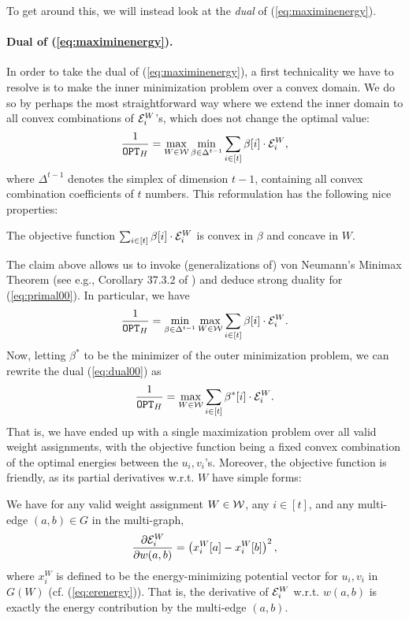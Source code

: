 \documentclass{article}
\begin{document}
To get around this, we will instead look at the \textit{dual} of
(\ref{eq:maximinenergy}).

\paragraph{Dual of (\ref{eq:maximinenergy}).}
In order to take the dual of (\ref{eq:maximinenergy}),
a first technicality we have to resolve is
to make
the inner minimization problem over a convex domain.
We do so by perhaps the most straightforward way where we extend the inner
domain to all convex combinations of $\mathcal{E}_i^{W}$'s,
which does not change the optimal value:
\begin{align}\label{eq:primal00}
    \frac{1}{\mathtt{OPT}_H} =
    \max_{W\in \mathcal{W}}\min_{\beta \in \Delta^{t-1}}
    \sum_{i\in [t]} \beta[i]\cdot \mathcal{E}_i^{W},
\end{align}
where $\Delta^{t-1}$ denotes the simplex of dimension $t-1$, containing
all convex combination coefficients of $t$ numbers.
This reformulation has the following nice properties:
\begin{claim}
    The objective function $\sum_{i\in [t]} \beta[i]\cdot \mathcal{E}_i^{W}$
    is convex in $\beta$ and concave in $W$.
\end{claim}

The claim above allows us to invoke (generalizations of) von Neumann's Minimax Theorem
(see e.g., Corollary 37.3.2 of \cite{Rockafellar70})
and deduce strong duality for (\ref{eq:primal00}). In particular, we have
\begin{align}\label{eq:dual00}
    \frac{1}{\mathtt{OPT}_H} = \min_{\beta \in \Delta^{t-1}}
    \max_{W\in \mathcal{W}}
    \sum_{i\in [t]} \beta[i]\cdot \mathcal{E}_i^{W}.
\end{align}
Now, letting $\beta^*$ to be the minimizer of the outer minimization problem,
we can rewrite the dual (\ref{eq:dual00}) as
\begin{align}\label{eq:dual11}
    \frac{1}{\mathtt{OPT}_H} =
    \max_{W\in \mathcal{W}}
    \sum_{i\in [t]} \beta^*[i]\cdot \mathcal{E}_i^{W}.
\end{align}
That is, we have ended up with a single maximization problem
over all valid weight assignments,
with the objective function being a fixed convex combination
of the optimal energies between the $u_i,v_i$'s.
Moreover, the objective function is friendly, as its partial derivatives w.r.t. $W$
have simple forms:
\begin{claim}
     We have for any valid weight assignment $W\in \mathcal{W}$,
    any $i\in[t]$, and any multi-edge $(a,b)\in G$ in the multi-graph,
    \begin{align}
        \frac{\partial \mathcal{E}^W_{i}}{\partial w(a,b)} = \left(x_{i}^W[a] - x_{i}^W[b]\right)^2,
    \end{align}
    where $x_i^W$ is defined to be the energy-minimizing potential vector for $u_i,v_i$
    in $G(W)$
    (cf. (\ref{eq:erenergy})).
    That is, the derivative of $\mathcal{E}_i^W$ w.r.t. $w(a,b)$ is exactly the
energy contribution by the multi-edge $(a,b)$.
\end{claim}
\end{document}
